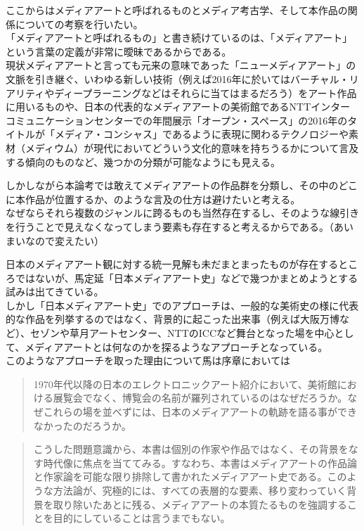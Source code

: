 ここからはメディアアートと呼ばれるものとメディア考古学、そして本作品の関係についての考察を行いたい。\\
「メディアアートと呼ばれるもの」と書き続けているのは、「メディアアート」という言葉の定義が非常に曖昧であるからである。\\
現状メディアアートと言っても元来の意味であった「ニューメディアアート」の文脈を引き継ぐ、いわゆる新しい技術（例えば2016年に於いてはバーチャル・リアリティやディープラーニングなどはそれらに当てはまるだろう）をアート作品に用いるものや、日本の代表的なメディアアートの美術館であるNTTインターコミュニケーションセンターでの年間展示「オープン・スペース」の2016年のタイトルが「メディア・コンシャス」であるように表現に関わるテクノロジーや素材（メディウム）が現代においてどういう文化的意味を持ちうるかについて言及する傾向のものなど、幾つかの分類が可能なようにも見える。

しかしながら本論考では敢えてメディアアートの作品群を分類し、その中のどこに本作品が位置するか、のような言及の仕方は避けたいと考える。\\
なぜならそれら複数のジャンルに跨るものも当然存在するし、そのような線引きを行うことで見えなくなってしまう要素も存在すると考えるからである。（あいまいなので変えたい）

日本のメディアアート観に対する統一見解も未だまとまったものが存在するところではないが、馬定延「日本メディアアート史」などで幾つかまとめようとする試みは出てきている。\\
しかし「日本メディアアート史」でのアプローチは、一般的な美術史の様に代表的な作品を列挙するのではなく、背景的に起こった出来事（例えば大阪万博など）、セゾンや草月アートセンター、NTTのICCなど舞台となった場を中心として、メディアアートとは何なのかを探るようなアプローチとなっている。\\
このようなアプローチを取った理由について馬は序章においては

\begin{quote}
1970年代以降の日本のエレクトロニックアート紹介において、美術館における展覧会でなく、博覧会の名前が羅列されているのはなぜだろうか。なぜこれらの場を並べずには、日本のメディアアートの軌跡を語る事ができなかったのだろうか。
\end{quote}

\begin{quote}
こうした問題意識から、本書は個別の作家や作品ではなく、その背景をなす時代像に焦点を当ててみる。すなわち、本書はメディアアートの作品論と作家論を可能な限り排除して書かれたメディアアート史である。このような方法論が、究極的には、すべての表層的な要素、移り変わっていく背景を取り除いたあとに残る、メディアアートの本質たるものを強調することを目的にしていることは言うまでもない。
\end{quote}

